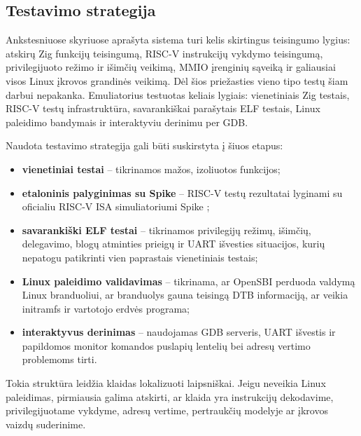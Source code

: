 \subsection{Testavimo strategija}
\label{sec:testavimo-strategija}

Ankstesniuose skyriuose aprašyta sistema turi kelis skirtingus teisingumo lygius: atskirų Zig funkcijų teisingumą, RISC-V instrukcijų vykdymo teisingumą, privilegijuoto režimo ir išimčių veikimą, MMIO įrenginių sąveiką ir galiausiai visos Linux įkrovos grandinės veikimą. Dėl šios priežasties vieno tipo testų šiam darbui nepakanka. Emuliatorius testuotas keliais lygiais: vienetiniais Zig testais, RISC-V testų infrastruktūra, savarankiškai parašytais ELF testais, Linux paleidimo bandymais ir interaktyviu derinimu per GDB.

Naudota testavimo strategija gali būti suskirstyta į šiuos etapus:

\begin{itemize}
    \item \textbf{vienetiniai testai} -- tikrinamos mažos, izoliuotos funkcijos;
    \item \textbf{etaloninis palyginimas su Spike} -- RISC-V testų rezultatai lyginami su oficialiu RISC-V ISA simuliatoriumi Spike \cite{spike-riscv-isa-sim};
    \item \textbf{savarankiški ELF testai} -- tikrinamos privilegijų režimų, išimčių, delegavimo, blogų atminties prieigų ir UART išvesties situacijos, kurių nepatogu patikrinti vien paprastais vienetiniais testais;
    \item \textbf{Linux paleidimo validavimas} -- tikrinama, ar OpenSBI perduoda valdymą Linux branduoliui, ar branduolys gauna teisingą DTB informaciją, ar veikia initramfs ir vartotojo erdvės programa;
    \item \textbf{interaktyvus derinimas} -- naudojamas GDB serveris, UART išvestis ir papildomos monitor komandos puslapių lentelių bei adresų vertimo problemoms tirti.
\end{itemize}

Tokia struktūra leidžia klaidas lokalizuoti laipsniškai. Jeigu neveikia Linux paleidimas, pirmiausia galima atskirti, ar klaida yra instrukcijų dekodavime, privilegijuotame vykdyme, adresų vertime, pertraukčių modelyje ar įkrovos vaizdų suderinime.
